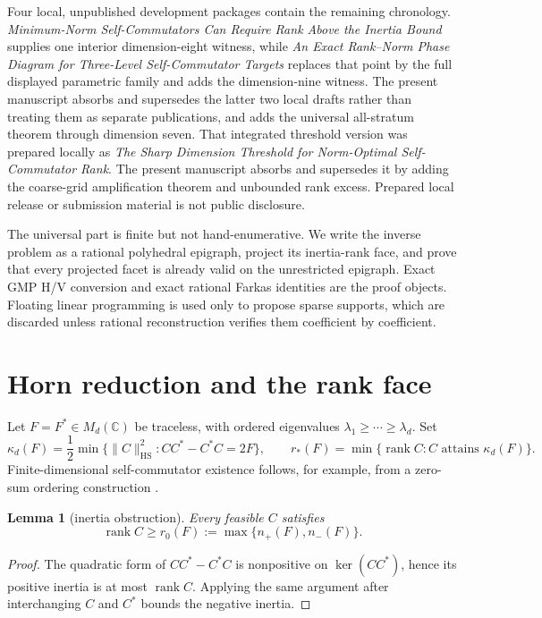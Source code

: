 \documentclass[11pt]{article}
\newtheorem{lemma}[theorem]{Lemma}
\newcommand{\HS}{\mathrm{HS}}
\newcommand{\rank}{\operatorname{rank}}
\begin{document}
Four local, unpublished development packages contain the remaining
chronology.  \emph{Minimum-Norm Self-Commutators Can Require Rank Above the
Inertia Bound} supplies one interior dimension-eight witness, while \emph{An
Exact Rank--Norm Phase Diagram for Three-Level Self-Commutator Targets}
replaces that point by the full displayed parametric family and adds the
dimension-nine witness.  The present manuscript absorbs and supersedes the
latter two local drafts rather than treating them as separate publications,
and adds the universal all-stratum theorem through dimension seven.  That
integrated threshold version was prepared locally as \emph{The Sharp
Dimension Threshold for Norm-Optimal Self-Commutator Rank}.  The present
manuscript absorbs and supersedes it by adding the coarse-grid amplification
theorem and unbounded rank excess.  Prepared local release or submission
material is not public disclosure.

The universal part is finite but not hand-enumerative.  We write the inverse
problem as a rational polyhedral epigraph, project its inertia-rank face, and
prove that every projected facet is already valid on the unrestricted
epigraph.  Exact GMP H/V conversion and exact rational Farkas identities are
the proof objects.  Floating linear programming is used only to propose
sparse supports, which are discarded unless rational reconstruction verifies
them coefficient by coefficient.

\section{Horn reduction and the rank face}

Let $F=F^*\in M_d(\mathbb C)$ be traceless, with ordered eigenvalues
$\lambda_1\ge\cdots\ge\lambda_d$.  Set
\begin{equation}
 \kappa_d(F)=\frac12\min\{\|C\|_{\HS}^2:CC^*-C^*C=2F\},
 \qquad
 r_*(F)=\min\{\rank C:C\text{ attains }\kappa_d(F)\}.
 \label{eq:def}
\end{equation}
Finite-dimensional self-commutator existence follows, for example, from a
zero-sum ordering construction \cite{fan1980,beltita2014}.

\begin{lemma}[inertia obstruction]\label{lem:inertia}
Every feasible $C$ satisfies
\[
 \rank C\ge r_0(F):=\max\{n_+(F),n_-(F)\}.
\]
\end{lemma}

\begin{proof}
The quadratic form of $CC^*-C^*C$ is nonpositive on $\ker(CC^*)$, hence its
positive inertia is at most $\rank C$.  Applying the same argument after
interchanging $C$ and $C^*$ bounds the negative inertia.
\end{proof}
\end{document}
